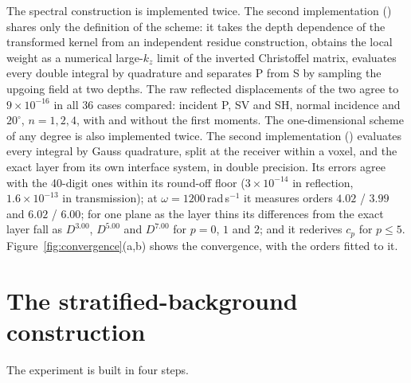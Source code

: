 \documentclass[11pt,a4paper]{article}
\begin{document}
The spectral construction is implemented twice. The second implementation
() shares only the definition of the scheme: it takes
the depth dependence of the transformed kernel from an independent residue construction, obtains
the local weight as a numerical large-$k_z$ limit of the inverted Christoffel matrix, evaluates every
double integral by quadrature and separates P from S by sampling the upgoing field at two depths.
The raw reflected displacements of the two agree to $9\times10^{-16}$ in all $36$ cases compared:
incident P, SV and SH, normal incidence and $20^\circ$, $n=1,2,4$, with and without the first moments.
The one-dimensional scheme of any degree is also implemented twice. The second implementation
() evaluates every integral by Gauss quadrature, split
at the receiver within a voxel, and the exact layer from its own interface system, in double
precision. Its errors agree with the 40-digit ones within its round-off floor ($3\times10^{-14}$ in
reflection, $1.6\times10^{-13}$ in transmission); at $\omega=1200$\,rad\,s$^{-1}$ it measures orders
$4.02$ / $3.99$ and $6.02$ / $6.00$; for one plane as the layer thins its differences from the exact
layer fall as $D^{3.00}$, $D^{5.00}$ and $D^{7.00}$ for $p=0$, $1$ and $2$; and it rederives $c_p$ for
$p\le5$. Figure~\ref{fig:convergence}(a,b) shows the convergence, with the orders fitted to it.

\FloatBarrier

\section{The stratified-background construction}\label{app:strat}

The experiment is built in four steps.
\end{document}
